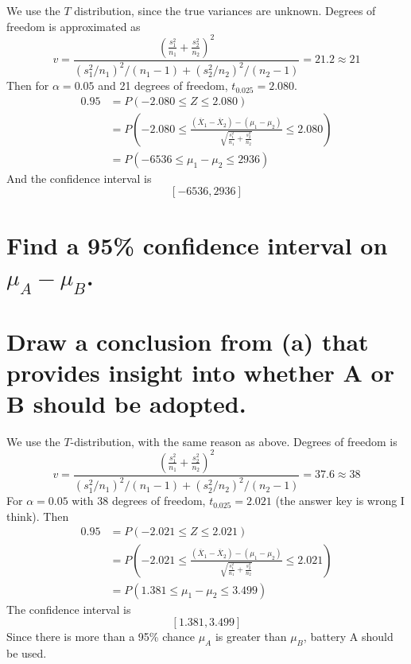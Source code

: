 \documentclass[answers]{exam}
\begin{document}
\begin{questions}
\begin{solution}
    We use the $T$ distribution, since the true variances are unknown. Degrees of freedom is approximated as
    $$v = \frac{\left(\frac{s_1^2}{n_1} + \frac{s_2^2}{n_2}\right)^2}{(s_1^2/n_1)^2/(n_1-1) + (s_2^2/n_2)^2/(n_2-1)} = 21.2 \approx 21$$
    Then for $\alpha = 0.05$ and 21 degrees of freedom, $t_{0.025} = 2.080$.
    \begin{align*}
        0.95 &= P(-2.080 \leq Z \leq 2.080) \\
             &= P\left(-2.080 \leq \frac{(\overline X_1 - \overline X_2) - (\mu_1 - \mu_2)}{\sqrt{\frac{s_1^2}{n_1} + \frac{s_2^2}{n_2}}} \leq 2.080\right) \\
             &= P(-6536 \leq \mu_1 - \mu_2 \leq 2936)
    \end{align*}
    And the confidence interval is
    $$[-6536, 2936]$$
\end{solution}


\begin{parts}
    \part{Find a 95\% confidence interval on $\mu_A - \mu_B$.}
    \part{Draw a conclusion from (a) that provides insight into whether A or B should be adopted.}
\end{parts}

\begin{solution}
    We use the $T$-distribution, with the same reason as above. Degrees of freedom is
    $$v = \frac{\left(\frac{s_1^2}{n_1} + \frac{s_2^2}{n_2}\right)^2}{(s_1^2/n_1)^2/(n_1-1) + (s_2^2/n_2)^2/(n_2-1)} = 37.6 \approx 38$$
    For $\alpha = 0.05$ with 38 degrees of freedom, $t_{0.025} = 2.021$ (the answer key is wrong I think). Then
    \begin{align*}
        0.95 &= P(-2.021 \leq Z \leq 2.021) \\
             &= P\left(-2.021 \leq \frac{(\overline X_1 - \overline X_2) - (\mu_1 - \mu_2)}{\sqrt{\frac{s_1^2}{n_1} + \frac{s_2^2}{n_2}}} \leq 2.021\right) \\
             &= P(1.381 \leq \mu_1 - \mu_2 \leq 3.499)
    \end{align*}
    The confidence interval is
    $$[1.381, 3.499]$$
    Since there is more than a 95\% chance $\mu_A$ is greater than $\mu_B$, battery A should be used.
\end{solution}


\end{questions}
\end{document}
